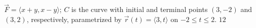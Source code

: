 {$\vec F = \langle x+y,x-y\rangle$; $C$ is the curve with initial and terminal points $(3,-2)$ and $(3,2)$, respectively, parametrized by $\vec r(t) = \langle 3,t\rangle$ on $-2\leq t\leq 2$.
}
{$12$
}
